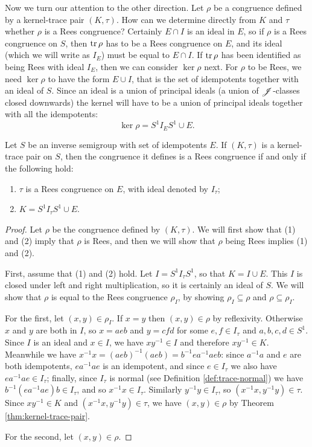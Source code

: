 Now we turn our attention to the other direction.  Let $\rho$ be a congruence
defined by a kernel-trace pair $(K, \tau)$.  How can we determine directly from
$K$ and $\tau$ whether $\rho$ is a Rees congruence?  Certainly $E \cap I$ is an
ideal in $E$, so if $\rho$ is a Rees congruence on $S$, then $\operatorname{tr} \rho$ has to
be a Rees congruence on $E$, and its ideal (which we will write as
$I_E$) must be equal to $E \cap I$.  If $\operatorname{tr} \rho$ has been identified
as being Rees with ideal $I_E$, then we can consider $\ker \rho$ next.
For $\rho$ to be Rees, we need $\ker \rho$ to have the form $E \cup I$, that is
the set of idempotents together with an ideal of $S$.  Since an ideal is a union
of principal ideals (a union of $\mathrel{\mathscr{J}}$-classes closed downwards) the kernel will
have to be a union of principal ideals together with all the idempotents:
$$\ker \rho = S^1 I_E S^1 \cup E.$$

\begin{theorem}
  \label{thm:kertr-to-rees}
  Let $S$ be an inverse semigroup with set of idempotents $E$.  If $(K, \tau)$
  is a kernel-trace pair on $S$, then the congruence it defines is a Rees
  congruence if and only if the following hold:
  \begin{enumerate}[(1)]
  \item $\tau$ is a Rees congruence on $E$, with ideal denoted by $I_\tau$;
  \item $K = S^1 I_\tau S^1 \cup E$.
  \end{enumerate}
  \begin{proof}
    Let $\rho$ be the congruence defined by $(K, \tau)$.  We will first show
    that (1) and (2) imply that $\rho$ is Rees, and then we will show that
    $\rho$ being Rees implies (1) and (2).

    First, assume that (1) and (2) hold.  Let $I = S^1 I_\tau S^1$, so that
    $K = I \cup E$.  This $I$ is closed under left and right multiplication, so
    it is certainly an ideal of $S$.  We will show that $\rho$ is equal to the
    Rees congruence $\rho_I$, by showing $\rho_I \subseteq \rho$ and
    $\rho \subseteq \rho_I$.

    For the first, let $(x,y) \in \rho_I$.  If $x=y$ then $(x,y) \in \rho$ by
    reflexivity.  Otherwise $x$ and $y$ are both in $I$, so $x = aeb$ and
    $y=cfd$ for some $e,f \in I_\tau$ and $a,b,c,d \in S^1$.  Since $I$ is an
    ideal and $x \in I$, we have $xy^{-1} \in I$ and therefore $xy^{-1} \in K$.
    Meanwhile we have $x^{-1}x = (aeb)^{-1}(aeb) = b^{-1}ea^{-1}aeb$: since
    $a^{-1}a$ and $e$ are both idempotents, $ea^{-1}ae$ is an idempotent, and
    since $e \in I_\tau$ we also have $ea^{-1}ae \in I_\tau$; finally, since
    $I_\tau$ is normal (see Definition \ref{def:trace-normal}) we have
    $b^{-1}(ea^{-1}ae)b \in I_\tau$, and so $x^{-1}x \in I_\tau$.  Similarly
    $y^{-1}y \in I_\tau$, so $(x^{-1}x, y^{-1}y) \in \tau$.  Since
    $xy^{-1} \in K$ and $(x^{-1}x, y^{-1}y) \in \tau$, we have $(x,y) \in \rho$
    by Theorem \ref{thm:kernel-trace-pair}.

    For the second, let $(x,y) \in \rho$.

  \end{proof}
\end{theorem}

